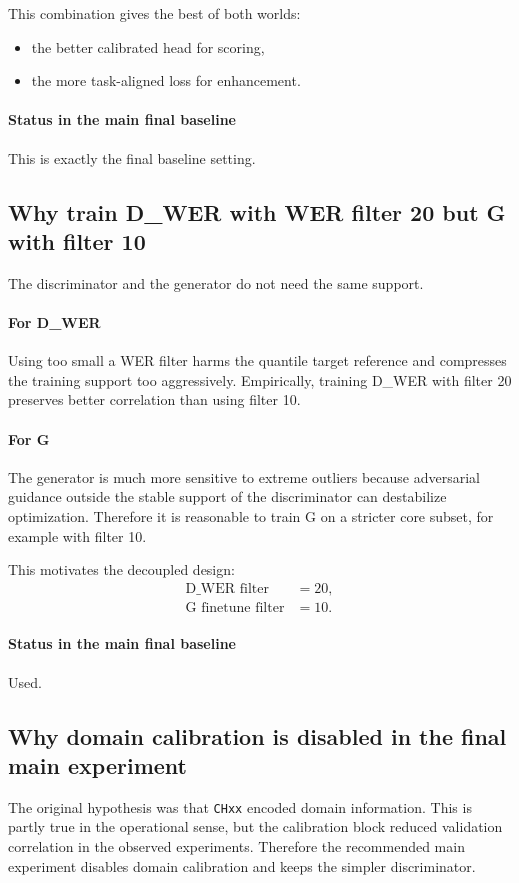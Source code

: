 \documentclass[11pt]{article}
\begin{document}
This combination gives the best of both worlds:
\begin{itemize}[leftmargin=*]
\item the better calibrated head for scoring,
\item the more task-aligned loss for enhancement.
\end{itemize}

\paragraph{Status in the main final baseline}
This is exactly the final baseline setting.

\subsection{Why train D\_WER with WER filter 20 but G with filter 10}
The discriminator and the generator do not need the same support.

\paragraph{For D\_WER}
Using too small a WER filter harms the quantile target reference and compresses the training support too aggressively. Empirically, training D\_WER with filter 20 preserves better correlation than using filter 10.

\paragraph{For G}
The generator is much more sensitive to extreme outliers because adversarial guidance outside the stable support of the discriminator can destabilize optimization. Therefore it is reasonable to train G on a stricter core subset, for example with filter 10.

This motivates the decoupled design:
\begin{align}
    \text{D\_WER filter} &= 20, \\
    \text{G finetune filter} &= 10.
\end{align}

\paragraph{Status in the main final baseline}
Used.

\subsection{Why domain calibration is disabled in the final main experiment}
The original hypothesis was that \texttt{CHxx} encoded domain information. This is partly true in the operational sense, but the calibration block reduced validation correlation in the observed experiments. Therefore the recommended main experiment disables domain calibration and keeps the simpler discriminator.
\end{document}
